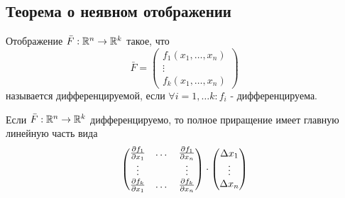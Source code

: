 \subsection{Теорема о неявном отображении}
\begin{definition}
    Отображение $\bar{F}:\mathbb{R}^n\to \mathbb{R}^k$ такое, что
    \[\bar{F}=\begin{pmatrix}
        f_1(x_1,\dots,x_n)\\
        \vdots\\
        f_k(x_1,\dots,x_n)
    \end{pmatrix}
    \]
    называется дифференцируемой, если $\forall i=1,\dots k: f_i$ - дифференцируема. 
\end{definition} 
\begin{statement}
    Если $\bar{F}: \mathbb{R}^n\to \mathbb{R}^k$ дифференцируемо, то полное приращение имеет главную линейную часть вида
    \[\begin{pmatrix}
        \frac{\partial {f_1}}{\partial {x_1}} & \dots & \frac{\partial {f_1}}{\partial {x_n}}\\
        \vdots & \null & \vdots\\
        \frac{\partial {f_k}}{\partial {x_1}} & \dots & \frac{\partial {f_k}}{\partial {x_n}}
    \end{pmatrix}
    \cdot \begin{pmatrix}
        \Delta x_1\\
        \vdots\\
        \Delta x_n
    \end{pmatrix}\]
\end{statement} 

